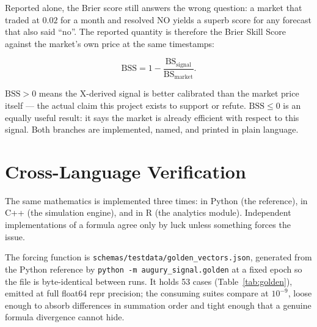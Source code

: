 \documentclass[11pt]{article}
\newcommand{\code}[1]{\texttt{\small #1}}
\begin{document}
Reported alone, the Brier score still answers the wrong question: a market that
traded at $0.02$ for a month and resolved NO yields a superb score for any
forecast that also said ``no''. The reported quantity is therefore the Brier
Skill Score against the market's own price at the same timestamps:

\begin{equation}
\text{BSS} = 1 - \frac{\text{BS}_{\text{signal}}}{\text{BS}_{\text{market}}}.
\end{equation}

$\text{BSS} > 0$ means the X-derived signal is better calibrated than the market
price itself --- the actual claim this project exists to support or refute.
$\text{BSS} \le 0$ is an equally useful result: it says the market is already
efficient with respect to this signal. Both branches are implemented, named, and
printed in plain language.

\section{Cross-Language Verification}
\label{sec:golden}

The same mathematics is implemented three times: in Python (the reference), in
C++ (the simulation engine), and in R (the analytics module). Independent
implementations of a formula agree only by luck unless something forces the
issue.

The forcing function is \code{schemas/testdata/golden\_vectors.json}, generated
from the Python reference by \code{python -m augury\_signal.golden} at a fixed
epoch so the file is byte-identical between runs. It holds 53 cases
(Table~\ref{tab:golden}), emitted at full float64 repr precision; the consuming
suites compare at $10^{-9}$, loose enough to absorb differences in summation
order and tight enough that a genuine formula divergence cannot hide.
\end{document}
